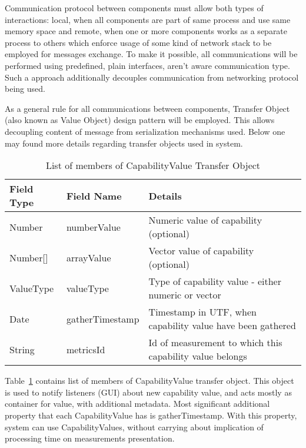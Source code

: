 Communication protocol between components must allow both types of interactions: local, when all components are part
of same process and use same memory space and remote, when one or more components works as a separate process to
others which enforce usage of some kind of network stack to be employed for messages exchange. To make it possible, all
communications will be performed using predefined, plain interfaces, aren't aware communication type. Such a approach
additionally decouples communication from networking protocol being used.

As a general rule for all communications between components, Transfer Object (also known as Value Object) design
pattern will be employed\cite{0131422464}. This allows decoupling content of message from serialization mechanisms
used. Below one may found more details regarding transfer objects used in system. 

\renewcommand*\arraystretch{1.2}


\begin{table}[h] %
\begin{tabular}{| m{} | m{} | m{} |}
   \hline 
   \cellcolor[gray]{0.9} Field Type & \cellcolor[gray]{0.9} Field Name & \cellcolor[gray]{0.9} Details \\
   \hline 
   Number & numberValue & Numeric value of capability (optional) \\
   Number[] & arrayValue & Vector value of capability (optional)  \\
   ValueType & valueType & Type of capability value - either numeric or vector\\
   Date & gatherTimestamp & Timestamp in UTF, when capability value have been gathered \\
   String & metricsId & Id of measurement to which this capability value belongs \\
   \hline 
\end{tabular}
 \caption{List of members of CapabilityValue Transfer Object}
 \label{tab:TO_CapValue}
\end{table} %

Table~\ref{tab:TO_CapValue} contains list of members of CapabilityValue transfer object. This
object is used to notify listeners (GUI) about new capability value, and acts mostly as container for value, with
additional metadata. Most significant additional property that each CapabilityValue has is gatherTimestamp. With this
property, system can use CapabilityValues, without carrying about implication of processing time on measurements
presentation.

